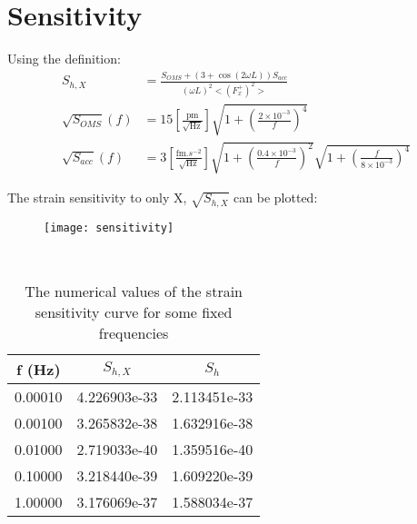 \documentclass{article}
\begin{document}
   \section{Sensitivity}
   Using the definition:
   \begin{align}
   	S_{h,X} &= \frac{S_{OMS} + (3 + \cos (2\omega L)) S_{acc}}{(\omega L)^2 <(F^+_x)^2>}\\
   	\sqrt{S_{OMS}}(f) &= 15\left[\frac{\text{pm}}{\sqrt{\text{Hz}}}\right] \sqrt{1 + \left(\frac{2\times10^{-3}}{f}\right)^4} \\
   	\sqrt{S_{acc}}(f) &= 3\left[\frac{\text{fm}.s^{-2}}{\sqrt{\text{Hz}}}\right] \sqrt{1 + \left(\frac{0.4\times10^{-3}}{f}\right)^2} \sqrt{1+\left(\frac{f}{8\times10^{-3}}\right)^4}
    \end{align}
    
    The strain sensitivity to only X, $\sqrt{S_{h,X}}$ can be plotted:
    \begin{figure}[H]
    	\centering
    	\texttt{[image: sensitivity]}
    	\caption{~}
    	\label{fig:sensitivity}
    \end{figure}
       
   \begin{table}[H]
   	\centering
   	\caption{The numerical values of the strain sensitivity curve for some fixed frequencies}
   	\begin{tabular}{|c|c|c|}
   		\hline
   		f (Hz) & $S_{h,X}$ & $S_{h}$ \\
   		\hline
   		0.00010 & 4.226903e-33 & 2.113451e-33 \\
   		\hline
   		0.00100 & 3.265832e-38 & 1.632916e-38 \\
   		\hline
   		0.01000 & 2.719033e-40 & 1.359516e-40 \\
   		\hline
   		0.10000 & 3.218440e-39 & 1.609220e-39 \\
   		\hline
   		1.00000 & 3.176069e-37 & 1.588034e-37 \\
   		\hline
   	\end{tabular}
   \end{table}
   
   
   
\end{document}
